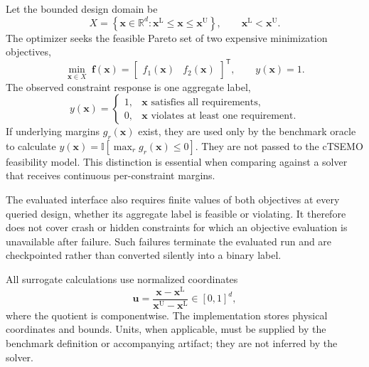 \documentclass[twoside]{article}
\newcommand{\R}{\mathbb{R}}
\begin{document}
Let the bounded design domain be
\begin{equation}
  X=
  \left\{\mathbf{x}\in\R^d:
  \mathbf{x}^{\mathrm L}\leq\mathbf{x}\leq\mathbf{x}^{\mathrm U}\right\},
  \qquad \mathbf{x}^{\mathrm L}<\mathbf{x}^{\mathrm U}.
\end{equation}
The optimizer seeks the feasible Pareto set of two expensive minimization
objectives,
\begin{equation}
  \min_{\mathbf{x}\in X}\;
  \mathbf{f}(\mathbf{x})
  =
  \begin{bmatrix}f_1(\mathbf{x})&f_2(\mathbf{x})\end{bmatrix}^{\mathsf T},
  \qquad y(\mathbf{x})=1.
  \label{eq:problem}
\end{equation}
The observed constraint response is one aggregate label,
\begin{equation}
  y(\mathbf{x})=
  \begin{cases}
    1, & \mathbf{x}\text{ satisfies all requirements},\\
    0, & \mathbf{x}\text{ violates at least one requirement}.
  \end{cases}
  \label{eq:binary-label}
\end{equation}
If underlying margins \(g_r(\mathbf{x})\) exist, they are used only by the
benchmark oracle to calculate \(y(\mathbf{x})=\mathbb{I}
[\max_r g_r(\mathbf{x})\leq0]\).  They are not passed to the cTSEMO
feasibility model.  This distinction is essential when comparing against a
solver that receives continuous per-constraint margins.

The evaluated interface also requires finite values of both objectives at
every queried design, whether its aggregate label is feasible or violating.
It therefore does not cover crash or hidden constraints for which an objective
evaluation is unavailable after failure. Such failures terminate the evaluated
run and are checkpointed rather than converted silently into a binary label.

All surrogate calculations use normalized coordinates
\begin{equation}
  \mathbf{u}=
  \frac{\mathbf{x}-\mathbf{x}^{\mathrm L}}
       {\mathbf{x}^{\mathrm U}-\mathbf{x}^{\mathrm L}}
  \in[0,1]^d,
  \label{eq:normalization}
\end{equation}
where the quotient is componentwise.  The implementation stores physical
coordinates and bounds.  Units, when applicable, must be supplied by the
benchmark definition or accompanying artifact; they are not inferred by the
solver.
\end{document}
